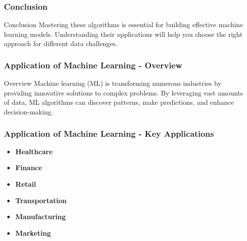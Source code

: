\documentclass[aspectratio=169]{beamer}
\begin{document}
\begin{frame}[fragile]
    \frametitle{Conclusion}
    \begin{block}{Conclusion}
        Mastering these algorithms is essential for building effective machine learning models. Understanding their applications will help you choose the right approach for different data challenges.
    \end{block}    
\end{frame}

\begin{frame}[fragile]
    \frametitle{Application of Machine Learning - Overview}
    \begin{block}{Overview}
        Machine learning (ML) is transforming numerous industries by providing innovative solutions to complex problems. 
        By leveraging vast amounts of data, ML algorithms can discover patterns, make predictions, and enhance decision-making.
    \end{block}
\end{frame}

\begin{frame}[fragile]
    \frametitle{Application of Machine Learning - Key Applications}
    \begin{itemize}
        \item \textbf{Healthcare}
        \item \textbf{Finance}
        \item \textbf{Retail}
        \item \textbf{Transportation}
        \item \textbf{Manufacturing}
        \item \textbf{Marketing}
    \end{itemize}
\end{frame}
\end{document}

